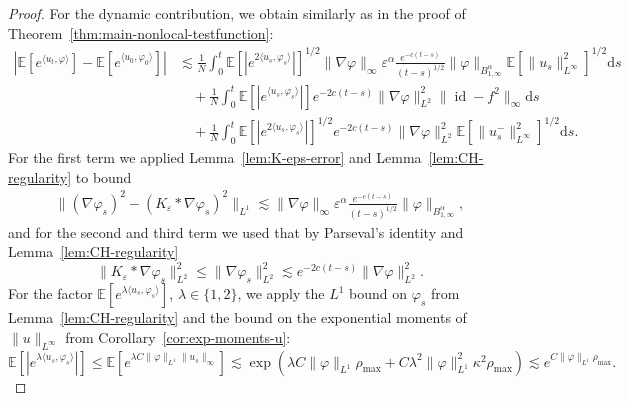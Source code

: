 \documentclass[a4paper,12pt]{article}
\newcommand{\mathd}{\mathrm{d}}
\newcommand{\E}{\mathbb{E}}
\begin{document}
\begin{proof}
  For the dynamic contribution, we obtain similarly as in the proof of Theorem~\ref{thm:main-nonlocal-testfunction}:
  \begin{align*} \nonumber
    | \mathbb{E} [e^{\langle u_t, \varphi \rangle}] -\mathbb{E} [e^{\langle
    u_0, \varphi_0 \rangle}] | &  \lesssim \frac{1}{N} \int_0^t \mathbb{E} [|e^{2 \langle u_s, \varphi_s
    \rangle}|]^{1 / 2} \| \nabla \varphi \|_{\infty} \varepsilon^{\alpha} \frac{e^{-c(t-s)}}{(t-s)^{1/2}} \|
    \varphi \|_{B^{\alpha}_{1,\infty}} \mathbb{E} [\| u_s \|_{L^\infty}^2]^{1 / 2}
    \mathd s\\ \nonumber
    & \quad + \frac{1}{N} \int_0^t \mathbb{E} [|e^{\langle u_s, \varphi_s
    \rangle}|]    e^{-2c(t-s)}\| \nabla \varphi \|_{L^2}^2 \| \operatorname{id} - f^2 \|_{\infty}
    \mathd s\\ 
    & \quad + \frac{1}{N} \int_0^t \mathbb{E} [|e^{2 \langle u_s, \varphi_s
    \rangle}|]^{1 / 2} e^{-2c(t-s)} \| \nabla \varphi \|_{L^2}^2 \mathbb{E} [\| u_s^-
    \|_{L^\infty}^2]^{1 / 2} \mathd s. 
  \end{align*}
  For the first term we applied Lemma~\ref{lem:K-eps-error} and Lemma~\ref{lem:CH-regularity} to bound
  \begin{align*}
    \| ( \nabla \varphi_s)^2 - ( K_{\varepsilon} \ast \nabla \varphi_s )^2
    \|_{L^1} \lesssim \| \nabla \varphi \|_{\infty} \varepsilon^{\alpha} \frac{e^{-c(t-s)}}{(t-s)^{1/2}} \|
    \varphi \|_{B^{\alpha}_{1,\infty}},
  \end{align*}  
  and for the second and third term we used that by Parseval's identity and Lemma~\ref{lem:CH-regularity}
  \[
   \| K_{\varepsilon} \ast \nabla
    \varphi_s \|_{L^2}^2 \leq \|\nabla \varphi_s\|_{L^2}^2 \lesssim e^{-2c(t-s)} \|\nabla \varphi\|_{L^2}^2 . %
  \]
  For the factor $\E[e^{\lambda \langle u_s,\varphi_s\rangle}]$, $\lambda \in \{1,2\}$, we apply the $L^1$ bound on $\varphi_s$ from Lemma~\ref{lem:CH-regularity} and the bound on the exponential moments of $\|u\|_{L^\infty}$ from Corollary~\ref{cor:exp-moments-u}:
  \begin{equation*}
    \mathbb{E} [|e^{\lambda \langle u_s, \varphi_s \rangle}|] \leq
     \mathbb{E} \left[ e^{\lambda C \| \varphi \|_{L^1} \| u_s \|_{\infty}}
     \right] \lesssim \exp (\lambda C \| \varphi \|_{L^1} \rho_{\max}
     +C\lambda^2 \| \varphi \|_{L^1}^2 \kappa^2 \rho_{\max}) \lesssim e^{C \| \varphi \|_{L^1} \rho_{\max}}.

\end{equation*}
\end{proof}
\end{document}
